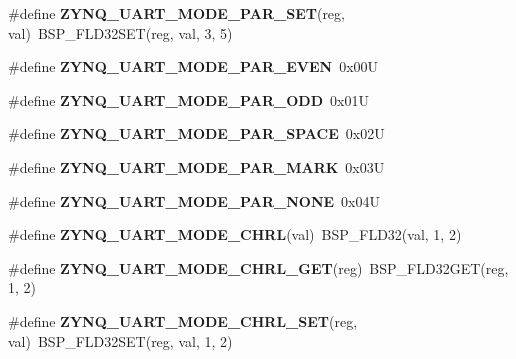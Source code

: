 \begin{DoxyCompactItemize}
\#define {\bfseries Z\+Y\+N\+Q\+\_\+\+U\+A\+R\+T\+\_\+\+M\+O\+D\+E\+\_\+\+P\+A\+R\+\_\+\+S\+ET}(reg,  val)~B\+S\+P\+\_\+\+F\+L\+D32\+S\+ET(reg, val, 3, 5)
\item 
\mbox{\label{zynq-uart-regs_8h_acad0b44ec49f0e83672784217413ed3e}} 
\#define {\bfseries Z\+Y\+N\+Q\+\_\+\+U\+A\+R\+T\+\_\+\+M\+O\+D\+E\+\_\+\+P\+A\+R\+\_\+\+E\+V\+EN}~0x00U
\item 
\mbox{\label{zynq-uart-regs_8h_a607c695249c313c22f65f38de17cad5b}} 
\#define {\bfseries Z\+Y\+N\+Q\+\_\+\+U\+A\+R\+T\+\_\+\+M\+O\+D\+E\+\_\+\+P\+A\+R\+\_\+\+O\+DD}~0x01U
\item 
\mbox{\label{zynq-uart-regs_8h_ac04705e85c9f19bea3ebdf15e0ebb7c7}} 
\#define {\bfseries Z\+Y\+N\+Q\+\_\+\+U\+A\+R\+T\+\_\+\+M\+O\+D\+E\+\_\+\+P\+A\+R\+\_\+\+S\+P\+A\+CE}~0x02U
\item 
\mbox{\label{zynq-uart-regs_8h_a3637dc36d00bc1484c0970fc310111ff}} 
\#define {\bfseries Z\+Y\+N\+Q\+\_\+\+U\+A\+R\+T\+\_\+\+M\+O\+D\+E\+\_\+\+P\+A\+R\+\_\+\+M\+A\+RK}~0x03U
\item 
\mbox{\label{zynq-uart-regs_8h_ae6cc4c38fa5beca363fc4f171716cfe2}} 
\#define {\bfseries Z\+Y\+N\+Q\+\_\+\+U\+A\+R\+T\+\_\+\+M\+O\+D\+E\+\_\+\+P\+A\+R\+\_\+\+N\+O\+NE}~0x04U
\item 
\mbox{\label{zynq-uart-regs_8h_a5d92cff99aa421aa4d93692409aaae1b}} 
\#define {\bfseries Z\+Y\+N\+Q\+\_\+\+U\+A\+R\+T\+\_\+\+M\+O\+D\+E\+\_\+\+C\+H\+RL}(val)~B\+S\+P\+\_\+\+F\+L\+D32(val, 1, 2)
\item 
\mbox{\label{zynq-uart-regs_8h_ae858e4358472e1f4a9ef3ac507715394}} 
\#define {\bfseries Z\+Y\+N\+Q\+\_\+\+U\+A\+R\+T\+\_\+\+M\+O\+D\+E\+\_\+\+C\+H\+R\+L\+\_\+\+G\+ET}(reg)~B\+S\+P\+\_\+\+F\+L\+D32\+G\+ET(reg, 1, 2)
\item 
\mbox{\label{zynq-uart-regs_8h_af679718108e906010ee4b09a65cbab2b}} 
\#define {\bfseries Z\+Y\+N\+Q\+\_\+\+U\+A\+R\+T\+\_\+\+M\+O\+D\+E\+\_\+\+C\+H\+R\+L\+\_\+\+S\+ET}(reg,  val)~B\+S\+P\+\_\+\+F\+L\+D32\+S\+ET(reg, val, 1, 2)
\item 
\mbox{\label{zynq-uart-regs_8h_abb9eb4e388f1e33e890c8c59e9f1176e}} 

\end{DoxyCompactItemize}
